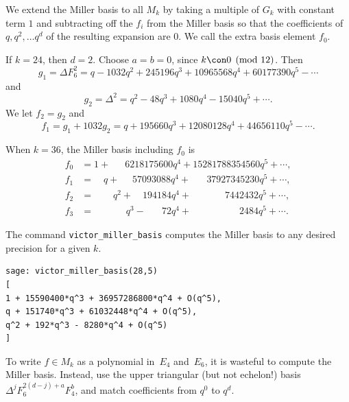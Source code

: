 We extend the Miller basis to all $M_k$ by taking
a multiple of $G_k$ with constant term $1$ and subtracting
off the $f_i$ from the Miller basis so that the
coefficients of $q, q^2, \ldots q^d$ of 
the resulting expansion are $0$.  We call the extra basis
element $f_0$.


\begin{example}
If $k=24$, then $d=2$.  Choose $a=b=0$, since $k\con 0\pmod{12}$.
Then 
$$g_1 = \Delta F_6^2 = 
q - 1032q^2 + 245196q^3 + 10965568q^4 + 60177390q^5 - \cdots
$$
and 
$$
g_2 = \Delta^2 = q^2 - 48q^3 + 1080q^4 - 15040q^5 + \cdots.
$$
We let $f_2=g_2$ and 
$$ 
f_1 = g_1 + 1032 g_2
 = q + 195660q^3 + 12080128q^4 + 44656110q^5 - \cdots.
$$
\end{example}

\begin{example}\label{ex:vmb36}
When $k=36$, the Miller basis including $f_0$ is
\begin{align*}
 f_0 &= 1 + \quad\,\,\, 6218175600q^4 + 15281788354560q^5 + \cdots,\\
 f_1 &= \,\,\,\,\,\,  q + \quad\,\, 57093088q^4 + \,\,\,\,\,\,\,\,\,\,37927345230q^5 +\cdots,\\
 f_2 &=  \qquad q^2 +  \,\,\,\,\,\,194184q^4 + \quad\,\,\,\,\,\,\,\,\,\,\,\,\,\,\, 7442432q^5 + \cdots,\\
 f_3 &=  \qquad\quad\,\, q^3 -\,\,\,\,\,\,\,\,\,\, 72q^4 +\qquad\quad\,\,\,\,\,\,\,\,\,\,\,\,  2484q^5 + \cdots.
\end{align*}
\end{example}

\begin{example}
The \sage{} command {\tt victor\_miller\_basis} computes 
the Miller basis to any desired precision
for a given $k$.
\begin{verbatim}
sage: victor_miller_basis(28,5)
[
1 + 15590400*q^3 + 36957286800*q^4 + O(q^5),
q + 151740*q^3 + 61032448*q^4 + O(q^5),
q^2 + 192*q^3 - 8280*q^4 + O(q^5)
]
\end{verbatim}
\end{example}


\begin{remark}\label{rem:elkies}
  To write $f \in M_k$ as a polynomial in~$E_4$ and~$E_6$,
  it is wasteful to compute the Miller basis.  Instead,
  use the upper triangular (but not echelon!) basis $\Delta^j
  F_6^{2(d-j)+a} F_4^b$, and match coefficients from $q^0$ to $q^d$.

\end{remark}

